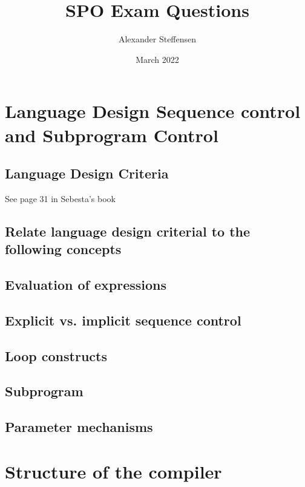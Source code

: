 \documentclass{article}
\title{SPO Exam Questions}
\author{Alexander Steffensen}
\date{March 2022}
\begin{document}
\maketitle

\pagebreak

\section{Language Design Sequence control and Subprogram Control}

\subsection{Language Design Criteria}

See page 31 in Sebesta's book

\subsection{Relate language design criterial to the following concepts}



\subsection{Evaluation of expressions}



\subsection{Explicit vs. implicit sequence control}

\subsection{Loop constructs}

\subsection{Subprogram}

\subsection{Parameter mechanisms}

\pagebreak

\section{Structure of the compiler}
\end{document}
